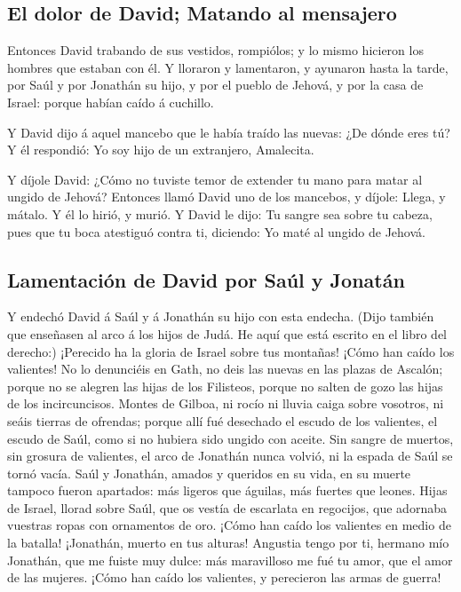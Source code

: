 \hypertarget{el-dolor-de-david-matando-al-mensajero}{%
\subsection{El dolor de David; Matando al
mensajero}\label{el-dolor-de-david-matando-al-mensajero}}

 Entonces David trabando de sus vestidos, rompiólos; y lo
mismo hicieron los hombres que estaban con él.  Y lloraron
y lamentaron, y ayunaron hasta la tarde, por Saúl y por Jonathán su
hijo, y por el pueblo de Jehová, y por la casa de Israel: porque habían
caído á cuchillo.

 Y David dijo á aquel mancebo que le había traído las
nuevas: ¿De dónde eres tú? Y él respondió: Yo soy hijo de un extranjero,
Amalecita.

 Y díjole David: ¿Cómo no tuviste temor de extender tu mano
para matar al ungido de Jehová?  Entonces llamó David uno
de los mancebos, y díjole: Llega, y mátalo. Y él lo hirió, y murió.
 Y David le dijo: Tu sangre sea sobre tu cabeza, pues que
tu boca atestiguó contra ti, diciendo: Yo maté al ungido de Jehová.

\hypertarget{lamentaciuxf3n-de-david-por-sauxfal-y-jonatuxe1n}{%
\subsection{Lamentación de David por Saúl y
Jonatán}\label{lamentaciuxf3n-de-david-por-sauxfal-y-jonatuxe1n}}

 Y endechó David á Saúl y á Jonathán su hijo con esta
endecha.  (Dijo también que enseñasen al arco á los hijos
de Judá. He aquí que está escrito en el libro del derecho:)
 ¡Perecido ha la gloria de Israel sobre tus montañas! ¡Cómo
han caído los valientes!  No lo denunciéis en Gath, no deis
las nuevas en las plazas de Ascalón; porque no se alegren las hijas de
los Filisteos, porque no salten de gozo las hijas de los incircuncisos.
 Montes de Gilboa, ni rocío ni lluvia caiga sobre vosotros,
ni seáis tierras de ofrendas; porque allí fué desechado el escudo de los
valientes, el escudo de Saúl, como si no hubiera sido ungido con aceite.
 Sin sangre de muertos, sin grosura de valientes, el arco
de Jonathán nunca volvió, ni la espada de Saúl se tornó vacía.
 Saúl y Jonathán, amados y queridos en su vida, en su
muerte tampoco fueron apartados: más ligeros que águilas, más fuertes
que leones.  Hijas de Israel, llorad sobre Saúl, que os
vestía de escarlata en regocijos, que adornaba vuestras ropas con
ornamentos de oro.  ¡Cómo han caído los valientes en medio
de la batalla! ¡Jonathán, muerto en tus alturas!  Angustia
tengo por ti, hermano mío Jonathán, que me fuiste muy dulce: más
maravilloso me fué tu amor, que el amor de las mujeres. 
¡Cómo han caído los valientes, y perecieron las armas de guerra!

